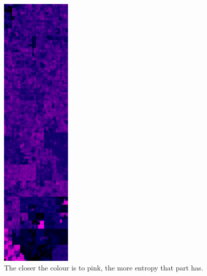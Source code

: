 \begin{figure}
	\begin{minipage}[b]{0.4\textwidth}
		\centering
		\includegraphics[width=0.3\textwidth]{reverse_engineering/tcpview_entropy.png}
		\caption{The closer the colour is to pink, the more entropy that part has.}
		\label{fig:entropy}
	\end{minipage}
	\hfill
	\begin{minipage}[b]{0.4\textwidth}
		\centering

\end{minipage}
\end{figure}
